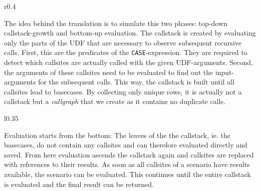 \begin{wrapfigure}{r}{0.4\linewidth}
\centering

\caption{}\label{tbl:callgraph}
\end{wrapfigure}

The idea behind the translation is to simulate this two phases: top-down callstack-growth and bottom-up evaluation. The callstack is created by evaluating only the parts of the UDF that are necessary to observe subsequent recursive calls. First, this are the predicates of the \texttt{CASE}-expression. They are required to detect which callsites are actually called with the given UDF-arguments. Second, the arguments of these callsites need to be evaluated to find out the input-arguments for the subsequent calls. This way, the callstack is built until all callsites lead to basecases. By collecting only unique rows, it is actually not a callstack but a \textit{callgraph} that we create as it contains no duplicate calls.




\begin{wrapfigure}{l}{0.35\linewidth}
\centering

\caption{}\label{tbl:evaluation}
\end{wrapfigure}

Evaluation starts from the bottom: The leaves of the the callstack, ie. the basecases, do not contain any callsites and can therefore evaluated directly and saved. From here evaluation ascends the callstack again and callsites are replaced with references to their results. As soon as all callsites of a scenario have results available, the scenario can be evaluated. This continues until the entire callstack is evaluated and the final result can be returned.


